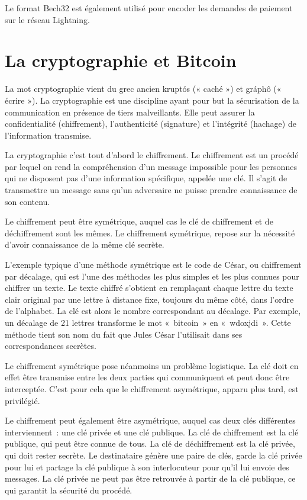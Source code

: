 Le format Bech32 est également utilisé pour encoder les demandes de paiement sur le réseau Lightning.

\section{La cryptographie et Bitcoin}

La mot cryptographie vient du grec ancien kruptós (« caché ») et gráphô (« écrire »). La cryptographie est une discipline ayant pour but la sécurisation de la communication en présence de tiers malveillants. Elle peut assurer la confidentialité (chiffrement), l'authenticité (signature) et l'intégrité (hachage) de l'information transmise.


La cryptographie c'est tout d'abord le chiffrement. Le chiffrement est un procédé par lequel on rend la compréhension d'un message impossible pour les personnes qui ne disposent pas d'une information spécifique, appelée une clé. Il s'agit de transmettre un message sans qu'un adversaire ne puisse prendre connaissance de son contenu.


Le chiffrement peut être symétrique, auquel cas le clé de chiffrement et de déchiffrement sont les mêmes. Le chiffrement symétrique, repose sur la nécessité d'avoir connaissance de la même clé secrète. 

L'exemple typique d'une méthode symétrique est le code de César, ou chiffrement par décalage, qui est l'une des méthodes les plus simples et les plus connues pour chiffrer un texte. Le texte chiffré s'obtient en remplaçant chaque lettre du texte clair original par une lettre à distance fixe, toujours du même côté, dans l'ordre de l'alphabet. La clé est alors le nombre correspondant au décalage. Par exemple, un décalage de 21 lettres transforme le mot «~bitcoin~» en «~wdoxjdi~». Cette méthode tient son nom du fait que Jules César l'utilisait dans ses correspondances secrètes.

Le chiffrement symétrique pose néanmoins un problème logistique. La clé doit en effet être transmise entre les deux parties qui communiquent et peut donc être interceptée. C'est pour cela que le chiffrement asymétrique, apparu plus tard, est privilégié.


Le chiffrement peut également être asymétrique, auquel cas deux clés différentes interviennent~: une clé privée et une clé publique. La clé de chiffrement est la clé publique, qui peut être connue de tous. La clé de déchiffrement est la clé privée, qui doit rester secrète. Le destinataire génère une paire de clés, garde la clé privée pour lui et partage la clé publique à son interlocuteur pour qu'il lui envoie des messages. La clé privée ne peut pas être retrouvée à partir de la clé publique, ce qui garantit la sécurité du procédé.


